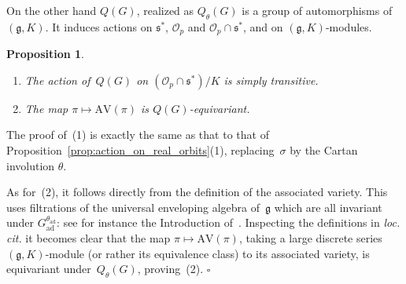 \documentclass[10pt,leqno]{article}
\newtheorem{proposition}[equation]{Proposition}
\numberwithin{equation}{section}
\newcommand{\qed}{\hfill $\square$ \medskip}
\newcommand{\kernel}{\mathrm{kernel}}
\newcommand{\ad}{\mathrm{ad}}
\newcommand{\Gad}{G_\mathrm{ad}}
\newcommand{\Stab}{\mathrm{Stab}}
\renewcommand{\O}{\mathcal O}
\newcommand{\R}{\mathbb R}
\newcommand{\g}{\mathfrak g}
\newcommand{\s}{\mathfrak s}
\newcommand{\AV}{\mathrm{AV}}
\newcommand{\Op}{\O_p}
\begin{document}

On the other hand $Q(G)$, realized as $Q_\theta(G)$ is a group of automorphisms of $(\g,K)$.
It induces actions on $\s^*$, $\Op$ and $\Op\cap\s^*$, and on $(\g,K)$-modules.

\begin{proposition}\label{prop:action_on_K_orbits}
\begin{enumerate} 
\item The action of~$Q(G)$ on $(\Op \cap \s^*)/K$ is simply transitive.
\item The map $\pi \mapsto \AV(\pi)$ is $Q(G)$-equivariant.
\end{enumerate}
\end{proposition}

The proof of~(1) is exactly the same as that  to that of Proposition~\ref{prop:action_on_real_orbits}(1), replacing~$\sigma$ by the Cartan involution $\theta$.

As for~(2), it follows directly from the definition of the associated variety. This uses filtrations of the universal enveloping algebra of~$\g$ which are all invariant under $\Gad^{\theta_{\ad}}$: see for instance the Introduction of~\cite{vogan_bowdoin}. Inspecting the definitions in \emph{loc. cit.} it becomes clear that the map $\pi \mapsto \AV(\pi)$, taking a large discrete series $(\g,K)$-module  (or rather its equivalence class) to its associated variety, is equivariant under~$Q_{\theta}(G)$, proving~(2). 
\qed
\end{document}
